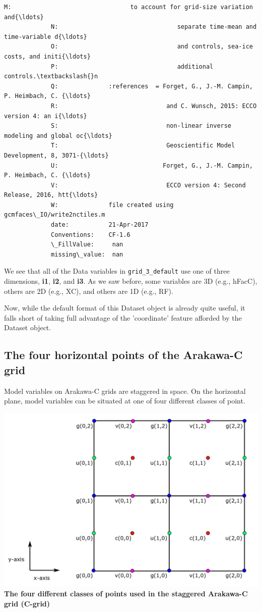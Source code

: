 \documentclass[11pt]{article}
\makeatletter
\def\maxwidth{\ifdim\Gin@nat@width>\linewidth\linewidth
    \else\Gin@nat@width\fi}
\let\Oldincludegraphics\includegraphics
\renewcommand{\includegraphics}[1]{\Oldincludegraphics[width=.8\maxwidth]{#1}}
\makeatother
\begin{document}
\begin{Verbatim}[commandchars=\\\{\}]
             M:                                 to account for grid-size variation and{\ldots}
             N:                                 separate time-mean and time-variable d{\ldots}
             O:                                 and controls, sea-ice costs, and initi{\ldots}
             P:                                 additional controls.\textbackslash{}n 
             Q:              :references  = Forget, G., J.-M. Campin, P. Heimbach, C. {\ldots}
             R:                              and C. Wunsch, 2015: ECCO version 4: an i{\ldots}
             S:                              non-linear inverse modeling and global oc{\ldots}
             T:                              Geoscientific Model Development, 8, 3071-{\ldots}
             U:                             Forget, G., J.-M. Campin, P. Heimbach, C. {\ldots}
             V:                              ECCO version 4: Second Release, 2016, htt{\ldots}
             W:              file created using gcmfaces\_IO/write2nctiles.m
             date:           21-Apr-2017
             Conventions:    CF-1.6
             \_FillValue:     nan
             missing\_value:  nan
\end{Verbatim}
            
    We see that all of the Data variables in \texttt{grid\_3\_default} use
one of three dimensions, \textbf{i1}, \textbf{i2}, and \textbf{i3}. As
we saw before, some variables are 3D (e.g., hFacC), others are 2D (e.g.,
XC), and others are 1D (e.g., RF).

Now, while the default format of this Dataset object is already quite
useful, it falls short of taking full advantage of the 'coordinate'
feature afforded by the Dataset object.

\subsection{The four horizontal points of the Arakawa-C
grid}\label{the-four-horizontal-points-of-the-arakawa-c-grid}

Model variables on Arakawa-C grids are staggered in space. On the
horizontal plane, model variables can be situated at one of four
different classes of point.

\includegraphics{../figures/C-grid-points.png} \textbf{The four
different classes of points used in the staggered Arakawa-C grid
(C-grid)}
\end{document}
